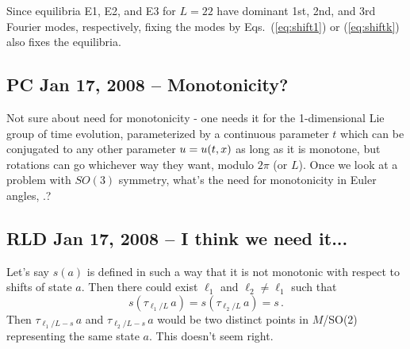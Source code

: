 \documentclass[letter,10pt]{article}
\begin{document}
Since equilibria E1, E2, and E3 for $L = 22$ have dominant
1st, 2nd, and 3rd Fourier modes, respectively, fixing the modes by
Eqs.~(\ref{eq:shift1}) or (\ref{eq:shiftk}) also fixes the equilibria.


\subsection{PC Jan 17, 2008 -- Monotonicity?}

Not sure about need for monotonicity - one needs it for the 1-dimensional
Lie group of time evolution, parameterized by a continuous parameter $t$
which can be conjugated to any other parameter $u = u(t,x)$ as long
as it is monotone, but rotations can go whichever way they want, modulo
$2\pi$ (or $L$). Once we look at a problem with $SO(3)$ symmetry, what's the
need for monotonicity in Euler angles, \etc.?

\subsection{RLD Jan 17, 2008 -- I think we need it...}
Let's say $s(a)$ is defined in such a way that it is not monotonic with respect to
shifts of state $a$.  Then there could exist $\ell_1$ and $\ell_2 \neq \ell_1$ such that
\[ s(\tau_{\ell_1/L}\,a) = s(\tau_{\ell_2/L}\,a) = s\,. \]
Then $\tau_{\ell_1/L - s}\,a$ and $\tau_{\ell_2/L - s}\,a$ would be two distinct points
in $M$/SO(2) representing the same state $a$.  This doesn't seem right.





\end{document}
